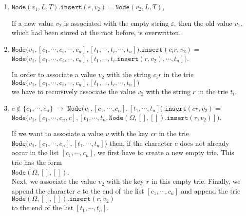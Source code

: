 \begin{enumerate}
\item $\texttt{Node}(v_1,L,T).\texttt{insert}(\varepsilon, v_2) = \texttt{Node}(v_2,L,T)$,
  
      If a new value $v_2$ is associated with the empty string $\varepsilon$, then the old value
      $v_1$, which had been stored at the root before, is overwritten.
\item $\texttt{Node}\bigl(v_1,[c_1,\cdots,c_i,\cdots,c_n], [t_1,\cdots,t_i,\cdots,t_n]\bigr).\texttt{insert}(c_ir,v_2) =$ \\[0.2cm]
      \hspace*{1.3cm}  
      $\texttt{Node}\bigl(v_1,[c_1,\cdots,c_i,\cdots,c_n], [t_1,\cdots,t_i.\texttt{insert}(r,v_2),\cdots,t_n]\bigr)$.

      In order to associate a value $v_2$ with the string $c_ir$ in the trie
      \\[0.2cm]
      \hspace*{1.3cm}
      $\texttt{Node}\bigl(v_1,[c_1,\cdots,c_i,\cdots,c_n], [t_1,\cdots,t_i,\cdots,t_n]\bigr)$ 
      \\[0.2cm]
      we have to recursively associate the value $v_2$ with the string $r$ in the trie $t_i$.
\item $c \not\in\{c_1,\cdots,c_n\} \;\rightarrow\;\texttt{Node}\bigl(v_1,[c_1,\cdots,c_n], [t_1,\cdots,t_n]\bigr).\texttt{insert}(cr,v_2) =$ \\[0.2cm]
      \hspace*{1.3cm}  
      $\texttt{Node}\bigl(v_1,[c_1,\cdots,c_n,c], [t_1,\cdots,t_n,\texttt{Node}(\Omega,[],[]).\texttt{insert}(r,v_2)]\bigr)$.
      
      If we want to associate a value $v$ with the key $cr$ in the trie
      $\texttt{Node}\bigl(v_1,[c_1,\cdots,c_n], [t_1,\cdots,t_n]\bigr)$ then, if the character $c$
      does not already occur in the list $[c_1,\cdots,c_n]$, we first have to create a new empty trie.
      This trie has the form \\[0.2cm]
      \hspace*{1.3cm} $\texttt{Node}(\Omega, [], [])$. \\[0.2cm]
      Next, we associate the value $v_2$ with the key $r$ in this empty trie.  Finally,
      we append the character $c$ to the end of the list $[c_1,\cdots,c_n]$ and append the trie
        \\[0.2cm] 
      \hspace*{1.3cm}
      $\texttt{Node}(\Omega, [], []).\texttt{insert}(r,v_2)$ 
      \\[0.2cm]
      to the end of the list $[t_1,\cdots,t_n]$.
\end{enumerate}

